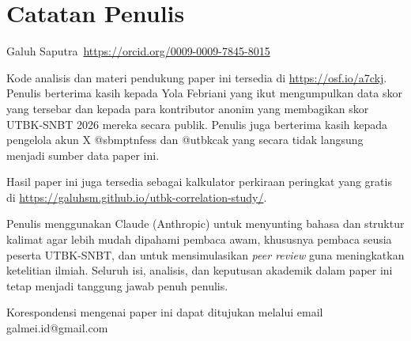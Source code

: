 \section*{Catatan Penulis}

Galuh Saputra\, \url{https://orcid.org/0009-0009-7845-8015}

Kode analisis dan materi pendukung paper ini tersedia di \url{https://osf.io/a7ckj}. Penulis berterima kasih kepada Yola Febriani yang ikut mengumpulkan data skor yang tersebar dan kepada para kontributor anonim yang membagikan skor UTBK-SNBT 2026 mereka secara publik. Penulis juga berterima kasih kepada pengelola akun X @sbmptnfess dan @utbkcak yang secara tidak langsung menjadi sumber data paper ini.

Hasil paper ini juga tersedia sebagai kalkulator perkiraan peringkat yang gratis di \url{https://galuhsm.github.io/utbk-correlation-study/}.

Penulis menggunakan Claude (Anthropic) untuk menyunting bahasa dan struktur kalimat agar lebih mudah dipahami pembaca awam, khususnya pembaca seusia peserta UTBK-SNBT, dan untuk mensimulasikan \textit{peer review} guna meningkatkan ketelitian ilmiah. Seluruh isi, analisis, dan keputusan akademik dalam paper ini tetap menjadi tanggung jawab penuh penulis.

Korespondensi mengenai paper ini dapat ditujukan melalui email galmei.id@gmail.com